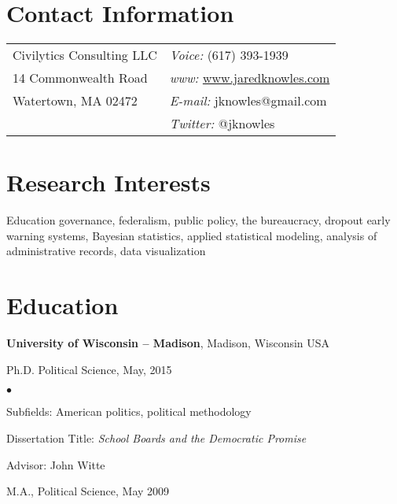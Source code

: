 \documentclass[margin,line]{res}
\newenvironment{list1}{
  \begin{list}{\ding{113}}{%
      \setlength{\itemsep}{0in}
      \setlength{\parsep}{0in} \setlength{\parskip}{0in}
      \setlength{\topsep}{0in} \setlength{\partopsep}{0in} 
      \setlength{\leftmargin}{0.17in}}}{\end{list}}
\newenvironment{list2}{
  \begin{list}{$\bullet$}{%
      \setlength{\itemsep}{0in}
      \setlength{\parsep}{0in} \setlength{\parskip}{0in}
      \setlength{\topsep}{0in} \setlength{\partopsep}{0in} 
      \setlength{\leftmargin}{0.2in}}}{\end{list}}
\begin{document}

\begin{resume}
\section{\sc Contact Information}
\vspace{.05in}
\begin{tabular}{@{}p{2.75in}p{2.75in}}
Civilytics Consulting LLC & {\it Voice:}  (617) 393-1939 \\            
14 Commonwealth Road & {\it www:} \url{www.jaredknowles.com} \\           
Watertown, MA 02472 & {\it E-mail:}  jknowles@gmail.com\\       
 & {\it Twitter:} @jknowles      \\   
\end{tabular}


\section{\sc Research Interests}
Education governance, federalism, public policy, the bureaucracy, dropout early warning systems, Bayesian statistics, applied statistical modeling, analysis of administrative records, data visualization

\section{\sc Education}
{\bf University of Wisconsin -- Madison}, Madison, Wisconsin USA\\
\vspace*{-.1in}
\begin{list1}
\item[] Ph.D. Political Science, May, 2015
\begin{list2}
\vspace*{.05in}
\item Subfields: American politics, political methodology
\item Dissertation Title: \emph {School Boards and the Democratic Promise} 
\item Advisor:  John Witte
\end{list2}
\vspace*{.05in}
\item[] M.A., Political Science,  May 2009
\end{list1}


\end{resume}
\end{document}
